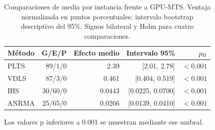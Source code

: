 \begin{table}[tbp]\centering\small
\caption{Comparaciones de media por instancia frente a GPU-MTS. Ventaja normalizada en puntos porcentuales; intervalo bootstrap descriptivo del 95\%. Signos bilateral y Holm para cuatro comparaciones.}
\label{tab:statistical}
\begin{tabular}{lrrrr}
\toprule
Método & G/E/P & Efecto medio & Intervalo 95\% & $p_{\rm H}$\\
\midrule
PLTS & 89/1/0 & 2.39 & [2.01, 2.78] & $<0.001$\\
VDLS & 87/3/0 & 0.461 & [0.404, 0.519] & $<0.001$\\
IHS & 30/60/0 & 0.0443 & [0.0225, 0.0700] & $<0.001$\\
ANRMA & 25/65/0 & 0.0266 & [0.0139, 0.0410] & $<0.001$\\
\bottomrule\end{tabular}
\par\smallskip\parbox{.97\linewidth}{\footnotesize Los valores p inferiores a 0.001 se muestran mediante ese umbral.}
\end{table}
